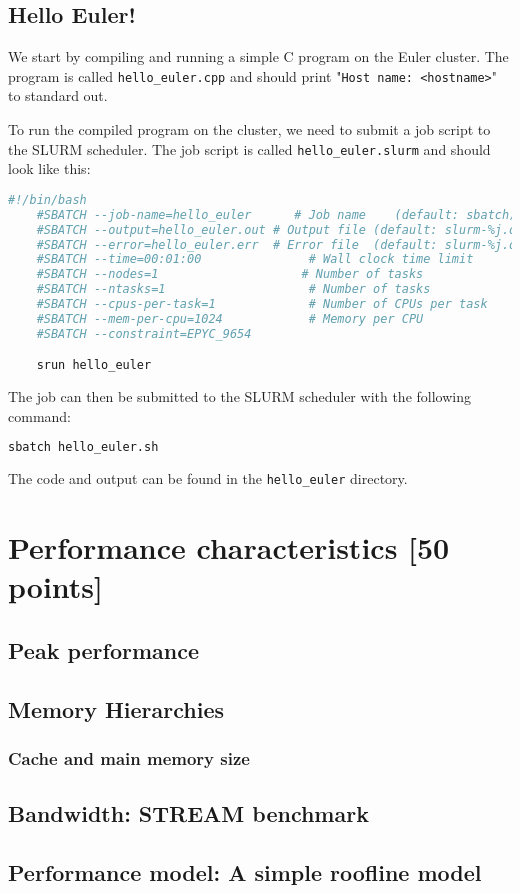 \documentclass[unicode,11pt,a4paper,oneside,numbers=endperiod,openany]{scrartcl}
\begin{document}
\subsection{Hello Euler!}

We start by compiling and running a simple C program on the Euler cluster. The program is called \texttt{hello\_euler.cpp} and should print "\texttt{Host name: <hostname>}" to standard out.

To run the compiled program on the cluster, we need to submit a job script to the SLURM scheduler. The job script is called \texttt{hello\_euler.slurm} and should look like this:

\begin{lstlisting}[language=bash,caption={Hello Euler Job Script}]
    #!/bin/bash
    #SBATCH --job-name=hello_euler      # Job name    (default: sbatch)
    #SBATCH --output=hello_euler.out # Output file (default: slurm-%j.out)
    #SBATCH --error=hello_euler.err  # Error file  (default: slurm-%j.out)
    #SBATCH --time=00:01:00               # Wall clock time limit
    #SBATCH --nodes=1                    # Number of tasks
    #SBATCH --ntasks=1                    # Number of tasks
    #SBATCH --cpus-per-task=1             # Number of CPUs per task
    #SBATCH --mem-per-cpu=1024            # Memory per CPU
    #SBATCH --constraint=EPYC_9654

    srun hello_euler
\end{lstlisting}

The job can then be submitted to the SLURM scheduler with the following command:
\begin{lstlisting}[language=bash]
    sbatch hello_euler.sh
\end{lstlisting}

The code and output can be found in the \texttt{hello\_euler} directory.

\section{Performance characteristics [50 points]}

\subsection{Peak performance}

\subsection{Memory Hierarchies}

\subsubsection{Cache and main memory size}

\subsection{Bandwidth: STREAM benchmark}

\subsection{Performance model: A simple roofline model}
\end{document}
